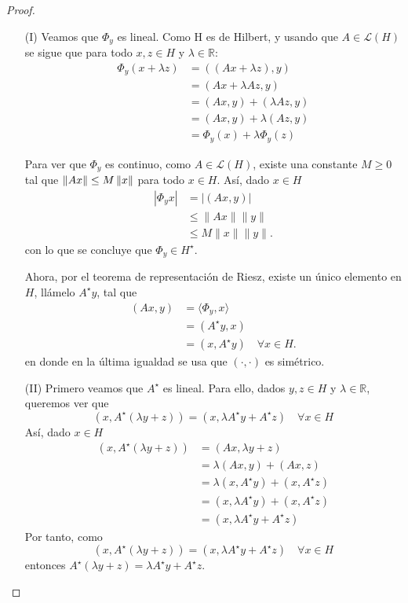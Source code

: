 \begin{proof}
    \begin{enumerate}
        \item [(I)]Veamos que $\Phi_y$ es lineal. Como H es de Hilbert, y usando que $A \in \mathcal{L}(H)$ se sigue que para todo $x,z \in H$ y $\lambda \in \mathbb{R}$:
\begin{align*}
\Phi_y(x+\lambda z) &= ((Ax+\lambda z), y) \\
&= (Ax+\lambda Az, y) \\
&= (Ax,y) + (\lambda Az,y) \\
&= (Ax,y) + \lambda (Az,y) \\
&= \Phi_y(x) + \lambda \Phi_y(z)
\end{align*}

Para ver que $\Phi_y$ es continuo, como $A \in \mathcal{L}(H)$, existe una constante $M\geq 0$ tal que $\left\|Ax\right\|\leq M\left\|x\right\|$ para todo $x \in H$. Así, dado $x \in H$
\begin{align*}
|\Phi_y x| &= |(Ax, y)| \\
&\le \|Ax\| \|y\| \\
&\le M \|x\| \|y\|.
\end{align*}
con lo que se concluye que $\Phi_y \in H^{\star}$.

Ahora, por el teorema de representación de Riesz, existe un único elemento en $H$, llámelo $A^{\star}y$, tal que
\begin{align*}
(Ax,y) &= \langle \Phi_y, x \rangle \\
&= (A^{\star}y, x) \\
&= (x, A^{\star}y) \quad \forall x \in H.
\end{align*}
en donde en la última igualdad se usa que $(\cdot, \cdot)$ es simétrico.
\item[(II)] Primero veamos que $A^\star$ es lineal. Para ello, dados $y, z \in H$ y $\lambda \in \mathbb{R}$,
queremos ver que
\[
(x, A^\star(\lambda y+z)) = (x, \lambda A^\star y + A^\star z) \quad \forall x \in H
\]
Así, dado $x \in H$
\begin{align*}
(x, A^\star(\lambda y+z)) &= (Ax, \lambda y+z) \\
&= \lambda (Ax,y) + (Ax,z) \\
&= \lambda (x, A^\star y) + (x, A^\star z) \\
&= (x, \lambda A^\star y) + (x, A^\star z) \\
&= (x, \lambda A^\star y + A^\star z)
\end{align*}
Por tanto, como
\[
(x, A^\star(\lambda y+z)) = (x, \lambda A^\star y + A^\star z) \quad \forall x \in H
\]
entonces $A^\star(\lambda y+z) = \lambda A^\star y + A^\star z$.


\end{enumerate}
\end{proof}
